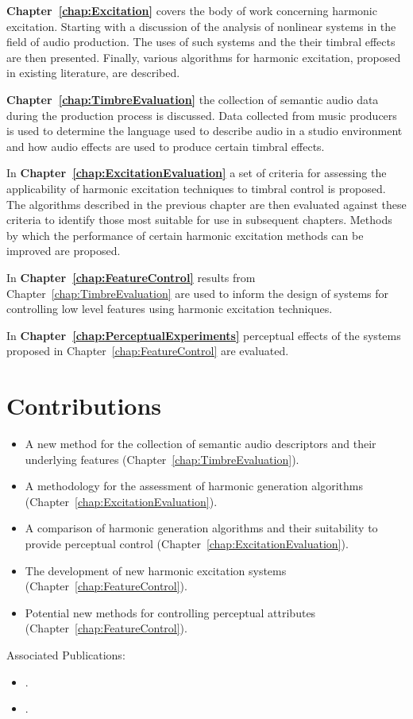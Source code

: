 	{\bf{Chapter~\ref{chap:Excitation}}} covers the body of work concerning harmonic excitation. Starting with a
	discussion of the analysis of nonlinear systems in the field of audio production. The uses of such systems and the
	their timbral effects are then presented. Finally, various algorithms for harmonic excitation, proposed in existing
	literature, are described.

	{\bf{Chapter~\ref{chap:TimbreEvaluation}}} the collection of semantic audio data during the production process is
	discussed. Data collected from music producers is used to determine the language used to describe audio in a studio
	environment and how audio effects are used to produce certain timbral effects.

	In {\bf{Chapter~\ref{chap:ExcitationEvaluation}}} a set of criteria for assessing the applicability of
	harmonic excitation techniques to timbral control is proposed. The algorithms described in the previous chapter are
	then evaluated against these criteria to identify those most suitable for use in subsequent chapters. Methods by
	which the performance of certain harmonic excitation methods can be improved are proposed.

	In {\bf{Chapter~\ref{chap:FeatureControl}}} results from Chapter~\ref{chap:TimbreEvaluation} are used to inform
	the design of systems for controlling low level features using harmonic excitation techniques.

	In {\bf{Chapter~\ref{chap:PerceptualExperiments}}} perceptual effects of the systems proposed in
	Chapter~\ref{chap:FeatureControl} are evaluated. 

\section{Contributions}
\label{sec:Introduction-Contributions}


	\begin{itemize}
		\item A new method for the collection of semantic audio descriptors and their underlying features
		      (Chapter~\ref{chap:TimbreEvaluation}).
		\item A methodology for the assessment of harmonic generation algorithms
		      (Chapter~\ref{chap:ExcitationEvaluation}).
		\item A comparison of harmonic generation algorithms and their suitability to provide perceptual control
		      (Chapter~\ref{chap:ExcitationEvaluation}).
		\item The development of new harmonic excitation systems (Chapter~\ref{chap:FeatureControl}).
		\item Potential new methods for controlling perceptual attributes (Chapter~\ref{chap:FeatureControl}).
	\end{itemize}

	Associated Publications:

	\begin{itemize}
		\item {}.
		\item {}.
	\end{itemize}

